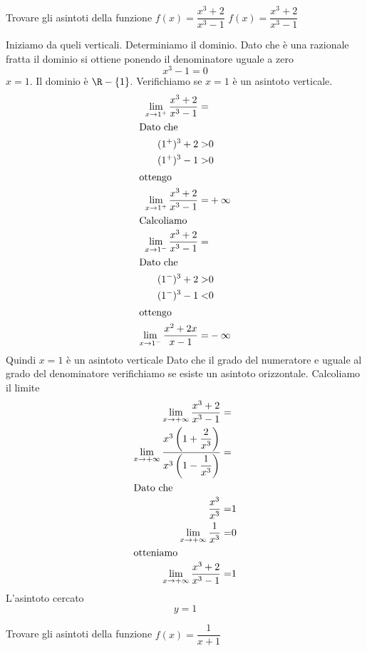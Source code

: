 \begin{exercise}
	Trovare gli asintoti della funzione $f(x)=\dfrac{x^3+2}{x^3-1}$
	\tcblower
$f(x)=\dfrac{x^3+2}{x^3-1}$	
	
	Iniziamo da queli verticali. Determiniamo il dominio. Dato che è una razionale fratta il dominio si ottiene ponendo il denominatore uguale a zero\[x^3-1=0\] $x=1$. Il dominio è $\R-\lbrace1\rbrace$. Verifichiamo se $x=1$ è un asintoto verticale.
	\begin{align*}
	\lim_{x\to 1^+}\dfrac{x^3+2}{x^3-1}=&\\
	\intertext{Dato che}
	(1^+)^3+2>&0\\
	(1^+)^3-1>&0\\
	\intertext{ottengo}
	\lim_{x\to 1^+}\dfrac{x^3+2}{x^3-1}=&+\infty\\
		\intertext{Calcoliamo}
	\lim_{x\to 1^-}\dfrac{x^3+2}{x^3-1}=&\\
		\intertext{Dato che}
	(1^-)^3+2>&0\\
	(1^-)^3-1<&0\\
	\intertext{ottengo}
	\lim_{x\to 1^-}\dfrac{x^2+2x}{x-1}=&-\infty\\
	\end{align*}
	Quindi $x=1$ è un asintoto verticale
	Dato che il grado del numeratore e uguale al grado del denominatore verifichiamo se esiste un asintoto orizzontale. Calcoliamo il limite
	\begin{align*}
	\lim_{x\to +\infty}\dfrac{x^3+2}{x^3-1}=&\\
	\lim_{x\to +\infty}\dfrac{x^3\left(1+\dfrac{2}{x^3}\right)}{x^3\left(1-\dfrac{1}{x^3}\right)}=&\\
	\intertext{Dato che}
	\dfrac{x^3}{x^3}=&1\\
	\lim_{x\to +\infty}\dfrac{1}{x^3}=&0\\
	\intertext{otteniamo}
	\lim_{x\to +\infty}\dfrac{x^3+2}{x^3-1}=&1\\
	\end{align*}
	L'asintoto cercato\[y=1\]
\end{exercise}
\begin{exercise}[no solution]
	Trovare gli asintoti della funzione
	$f(x)=\dfrac{1}{x+1}$
\end{exercise}
